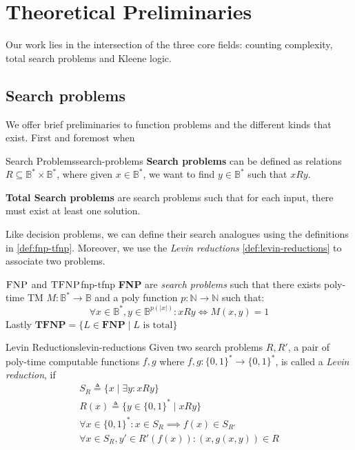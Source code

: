 \section{Theoretical Preliminaries}

Our work lies in the intersection of the three core fields:
counting complexity, total search problems and Kleene logic.

\subsection{Search problems}
We offer brief preliminaries to function problems and the different kinds that exist.
First and foremost when

\begin{definitionbox}{Search Problems}{search-problems}
    \textbf{Search problems} can be defined as relations $R \subseteq \mathbb{B}^* \times \mathbb{B}^*$,
    where given $x \in \mathbb{B}^*$, we want to find $y \in \mathbb{B}^*$  such that $xRy$.

    \textbf{Total Search problems} are search problems such that for each input, there must exist at least one solution.
\end{definitionbox}

Like decision problems, we can define their search analogues
using the definitions in \ref{def:fnp-tfnp}.
Moreover, we use the \textit{Levin reductions} \ref{def:levin-reductions} to associate
two problems.


\begin{definitionbox}{$\textnormal{\textsc{FNP}}$ and $\textnormal{\textsc{TFNP}}$}{fnp-tfnp}
    \label{def:fnp-tfnp}
    \textbf{FNP} are \textit{search problems} such that there exists poly-time TM $M: \mathbb{B}^* \to \mathbb{B}$
    and a poly function $p : \mathbb{N} \to \mathbb{N}$ such that:
    $$
        \forall x \in \mathbb{B}^*, y \in \mathbb{B}^{p(|x|)}: xRy \iff M(x,y) = 1
    $$
    Lastly $\textbf{TFNP} = \{L \in \textbf{FNP} \mid L \text{ is total}\}$
\end{definitionbox}

\begin{definitionbox}{Levin Reductions}{levin-reductions}
    \label{def:levin-reductions}
    Given two search problems $R,R'$,
    a pair of poly-time computable functions \(f,g\) where \(f,g: \{0,1\}^* \to \{0,1\}^*\), is
    called a \textit{Levin reduction}, if
    \begin{gather*}
        S_R \triangleq \{x \mid \exists y : xRy\} \\
        R(x) \triangleq \{y \in \{0,1\}^* \mid xRy\} \\
        \forall x \in \{0,1\}^*: x \in  S_R \implies f(x) \in S_{R'}\\
        \forall x \in S_R, y' \in R'(f(x)): (x,g(x,y)) \in R
    \end{gather*}
\end{definitionbox}

